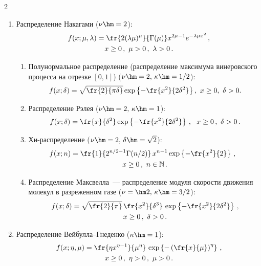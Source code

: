 \begin{multicols}{2}
\begin{enumerate}[1.]
\begin{enumerate}[{1}.1]
\item Распределение хи-квад\-рат ($\nu\hm=1,\, \delta\hm=2)$:
\begin{multline*}
f(x;n)=\fr{1}{2\Gamma({n}/2)}\left(\fr{x}{2}\right)^{n/2-1}e^{-x/2}\,,\\
x\ge0\,,\ n\in\mathbb{N}\,.
\end{multline*}
\end{enumerate}
\item Распределение Накагами ($\nu\hm=2$):
\begin{multline*}
f(x;\mu,\lambda)=\fr{2(\lambda\mu)^{\mu}}{\Gamma(\mu)}x^{2\mu-1}e^{-\lambda\mu
x^2}\,,\\
 x\ge0\,, \ \mu>0\,,\ \lambda>0\,.
\end{multline*}
\begin{enumerate}[{2.}1]
\item Полунормальное распределение (распределение максимума
винеровского процесса на отрезке $[0,1]$)
($\nu\hm=2,\,\kappa\hm=1/2$):
\begin{equation*}
f(x;\delta)=\sqrt{\fr{2}{\pi\delta}}\exp\left\{-\fr{x^2}{2\delta^2}\right\},\
x\ge0, \ \delta>0.
\end{equation*}
\item Распределение Рэлея ($\nu\hm=2,\,\kappa\hm=1$):
\begin{equation*}
f(x;\delta)=\fr{x}{\delta^2}\exp\left\{-\fr{x^2}{2\delta^2}\right\}\,,\ \ 
x\ge0\,, \ \delta>0\,.
\end{equation*}

\item Хи-распределение ($\nu\hm=2,\,\delta\hm=\sqrt{2}$):
\begin{multline*}
\hspace*{-7pt}f(x;n)=\fr{1}{2^{n/2-1}\Gamma({n}/{2})}\,x^{n-1}\exp\left\{-\fr{x^2}{2}\right\}\,,\\
x\ge0\,, \ n\in\mathbb{N}\,.
\end{multline*}
\item Распределение Максвелла~--- распределение модуля скорости движения
молекул в разреженном газе ($\nu=\hm2,\,\kappa\hm=3/2$):
\begin{multline*}
f(x;\delta)=\sqrt{\fr{2}{\pi}}\,\fr{x^2}{\delta^3}\,\exp\left\{-\fr{x^2}{2\delta^2}\right\}\,,\\
x\ge0\,, \ \delta>0\,.
\end{multline*}
\end{enumerate}
\item Распределение Вей\-бул\-ла--Гне\-ден\-ко ($\kappa\hm=1$):
\begin{multline*}
f(x;\eta,\mu)=\fr{\eta x^{\eta-1}}{\mu^{\eta}}\,
\exp\left\{-\left(\fr{x}{\mu}\right)^{\eta}\right\}\,,\\
x\ge0\,, \ \eta>0\,,\ \mu>0\,.
\end{multline*}


\end{enumerate}
\end{multicols}
